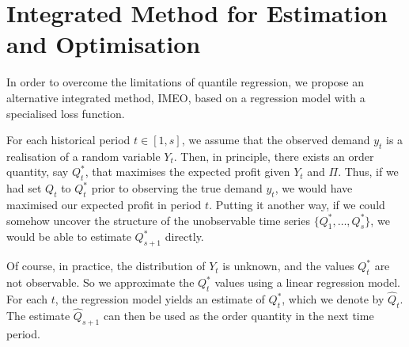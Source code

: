\documentclass{article}
\begin{document}
\section{Integrated Method for Estimation and Optimisation} \label{se:new}

In order to overcome the limitations of quantile regression, we propose an alternative integrated method, IMEO, based on a regression model with a specialised loss function.

For each historical period $t\in [1,s]$, we assume that the observed demand $y_t$ is a realisation of a random variable $Y_t$. Then, in principle, there exists an order quantity, say $Q_t^*$, that maximises the expected profit given $Y_t$ and $\Pi$. Thus, if we had set $Q_t$ to $Q_t^*$ prior to observing the true demand $y_t$, we would have maximised our expected profit in period $t$. Putting it another way, if we could somehow uncover the structure of the unobservable time series $\big\{ Q_1^*,\dots,Q_s^* \big\}$, we would be able to estimate $Q_{s+1}^*$ directly.

Of course, in practice, the distribution of $Y_t$ is unknown, and the values $Q_t^*$ are not observable. So we approximate the $Q_t^*$ values using a linear regression model. For each $t$, the regression model yields an estimate of $Q^*_t$, which we denote by $\hat{Q}_t$. The estimate $\hat{Q}_{s+1}$ can then be used as the order quantity in the next time period.
\end{document}
